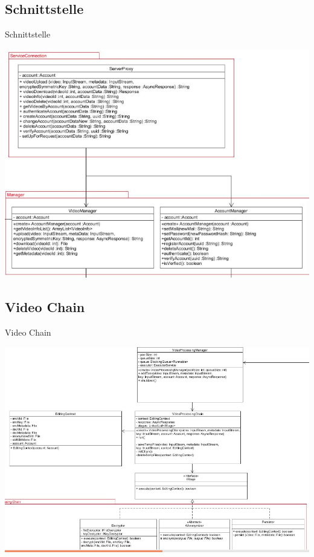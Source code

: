 \documentclass[19pt]{beamer}
\begin{document}
\subsection{Schnittstelle}
\begin{frame}{Schnittstelle}
\begin{center}
\includegraphics[scale=0.3]{resources/service_rest.png}
\end{center}
\end{frame}
\subsection{Video Chain}
\begin{frame}{Video Chain}
\begin{center}
\includegraphics[scale=0.3]{resources/service_vidchain.png}
\end{center}
\end{frame}
\end{document}

